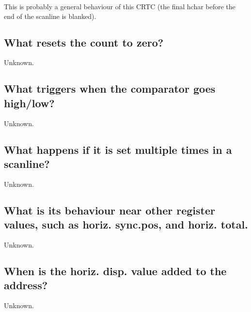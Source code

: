 \documentclass[a4paper,10pt]{amsart}
\begin{document}
This is probably a general behaviour of this CRTC (the final hchar before
the end of the scanline is blanked).

\subsection{What resets the count to zero?}

Unknown.

\subsection{What triggers when the comparator goes high/low?}

Unknown.

\subsection{What happens if it is set multiple times in a scanline?}

Unknown.

\subsection{What is its behaviour near other register values, such as horiz. sync.pos,
      and horiz. total.}

Unknown.

\subsection{When is the horiz. disp. value added to the address?}

Unknown.
\end{document}
